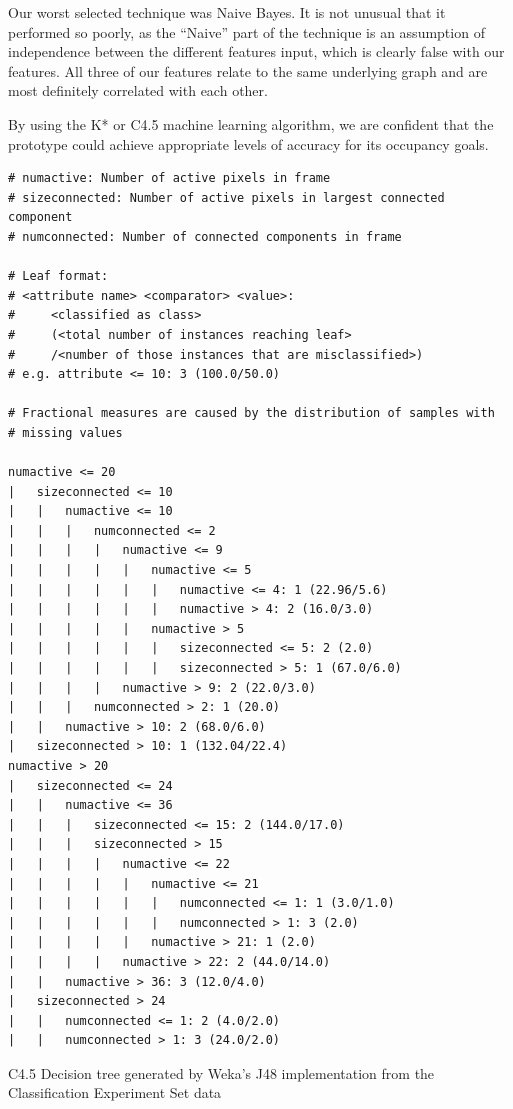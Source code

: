 \documentclass[../thesis/thesis.tex]{subfiles}
\begin{document}
Our worst selected technique was Naive Bayes. It is not unusual that it performed so poorly, as the ``Naive'' part of the technique is an assumption of independence between the different features input, which is clearly false with our features. All three of our features relate to the same underlying graph and are most definitely correlated with each other.

By using the K* or C4.5 machine learning algorithm, we are confident that the prototype could achieve appropriate levels of accuracy for its occupancy goals.

\begin{listing}

\begin{verbatim}
# numactive: Number of active pixels in frame
# sizeconnected: Number of active pixels in largest connected component
# numconnected: Number of connected components in frame

# Leaf format:
# <attribute name> <comparator> <value>:
#     <classified as class>
#     (<total number of instances reaching leaf>
#     /<number of those instances that are misclassified>)
# e.g. attribute <= 10: 3 (100.0/50.0)

# Fractional measures are caused by the distribution of samples with
# missing values

numactive <= 20
|   sizeconnected <= 10
|   |   numactive <= 10
|   |   |   numconnected <= 2
|   |   |   |   numactive <= 9
|   |   |   |   |   numactive <= 5
|   |   |   |   |   |   numactive <= 4: 1 (22.96/5.6)
|   |   |   |   |   |   numactive > 4: 2 (16.0/3.0)
|   |   |   |   |   numactive > 5
|   |   |   |   |   |   sizeconnected <= 5: 2 (2.0)
|   |   |   |   |   |   sizeconnected > 5: 1 (67.0/6.0)
|   |   |   |   numactive > 9: 2 (22.0/3.0)
|   |   |   numconnected > 2: 1 (20.0)
|   |   numactive > 10: 2 (68.0/6.0)
|   sizeconnected > 10: 1 (132.04/22.4)
numactive > 20
|   sizeconnected <= 24
|   |   numactive <= 36
|   |   |   sizeconnected <= 15: 2 (144.0/17.0)
|   |   |   sizeconnected > 15
|   |   |   |   numactive <= 22
|   |   |   |   |   numactive <= 21
|   |   |   |   |   |   numconnected <= 1: 1 (3.0/1.0)
|   |   |   |   |   |   numconnected > 1: 3 (2.0)
|   |   |   |   |   numactive > 21: 1 (2.0)
|   |   |   |   numactive > 22: 2 (44.0/14.0)
|   |   numactive > 36: 3 (12.0/4.0)
|   sizeconnected > 24
|   |   numconnected <= 1: 2 (4.0/2.0)
|   |   numconnected > 1: 3 (24.0/2.0)
\end{verbatim}

\caption{C4.5 Decision tree generated by Weka's J48 implementation from the Classification Experiment Set data}
\label{lst:tree}
\end{listing}
\end{document}
